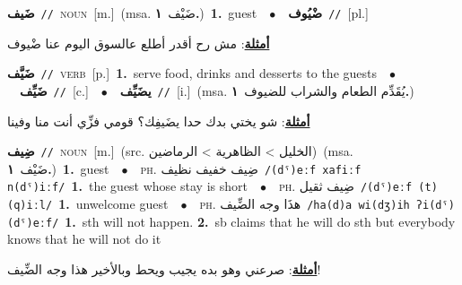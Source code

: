 \documentclass[10pt,a4paper,twoside]{article} %
\begin{document}
\begin{multicols}{2}
{\setlength\topsep{0pt}\textbf{\foreignlanguage{arabic}{ضَيف}}\ {\color{gray}\texttt{//}\color{black}}\ \textsc{noun}\ [m.]\ \color{gray}(msa. \foreignlanguage{arabic}{ضَيْف}~\foreignlanguage{arabic}{\textbf{١.}})\color{black}\ \textbf{1.}~guest\ \ $\bullet$\ \ \setlength\topsep{0pt}\textbf{\foreignlanguage{arabic}{ضْيُوف}}\ {\color{gray}\texttt{//}\color{black}}\ [pl.]\  \begin{flushright}\color{gray}\foreignlanguage{arabic}{\textbf{\underline{\foreignlanguage{arabic}{أمثلة}}}: مش رح أقدر أطلع عالسوق اليوم عنا ضْيوف}\end{flushright}\color{black}} \vspace{2mm}

{\setlength\topsep{0pt}\textbf{\foreignlanguage{arabic}{ضَيَّف}}\ {\color{gray}\texttt{//}\color{black}}\ \textsc{verb}\ [p.]\ \textbf{1.}~serve food, drinks and desserts to the guests\ \ $\bullet$\ \ \setlength\topsep{0pt}\textbf{\foreignlanguage{arabic}{ضَيِّف}}\ {\color{gray}\texttt{//}\color{black}}\ [c.]\ \ $\bullet$\ \ \setlength\topsep{0pt}\textbf{\foreignlanguage{arabic}{يضَيِّف}}\ {\color{gray}\texttt{//}\color{black}}\ [i.]\ \color{gray}(msa. \foreignlanguage{arabic}{يُقَدِّم الطعام والشراب للضيوف}~\foreignlanguage{arabic}{\textbf{١.}})\color{black}\  \begin{flushright}\color{gray}\foreignlanguage{arabic}{\textbf{\underline{\foreignlanguage{arabic}{أمثلة}}}: شو يختي بدك حدا يضَيفِك؟ قومي فزِّي أنت منا وفينا}\end{flushright}\color{black}} \vspace{2mm}

{\setlength\topsep{0pt}\textbf{\foreignlanguage{arabic}{ضِيف}}\ {\color{gray}\texttt{//}\color{black}}\ \textsc{noun}\ [m.]\ (src. \color{gray}\foreignlanguage{arabic}{الخليل > الظاهرية > الرماضين}\color{black})\ \color{gray}(msa. \foreignlanguage{arabic}{ضَيْف}~\foreignlanguage{arabic}{\textbf{١.}})\color{black}\ \textbf{1.}~guest\ \ $\bullet$\ \ \textsc{ph.} \color{gray} \foreignlanguage{arabic}{ضِيف خفيف نظيف}\color{black}\ {\color{gray}\texttt{/{\sffamily (dˤ)eːf xafiːf n(dˤ)iːf}/}\color{black}}\ \textbf{1.}~the guest whose stay is short\ \ $\bullet$\ \ \textsc{ph.} \color{gray} \foreignlanguage{arabic}{ضِيف ثقيل}\color{black}\ {\color{gray}\texttt{/{\sffamily (dˤ)eːf (t)(q)iːl}/}\color{black}}\ \textbf{1.}~unwelcome guest\ \ $\bullet$\ \ \textsc{ph.} \color{gray} \foreignlanguage{arabic}{هذَا وجه الضِّيف}\color{black}\ {\color{gray}\texttt{/{\sffamily ha(d)a wi(dʒ)ih ʔi(dˤ)(dˤ)eːf}/}\color{black}}\ \textbf{1.}~sth will not happen.  \textbf{2.}~sb claims that he will do sth but everybody knows that he will not do it\  \begin{flushright}\color{gray}\foreignlanguage{arabic}{\textbf{\underline{\foreignlanguage{arabic}{أمثلة}}}: صرعني وهو بده يجيب ويحط وبالأخير هذا وجه الضِّيف!}\end{flushright}\color{black}} \vspace{2mm}


\end{multicols}
\end{document}
